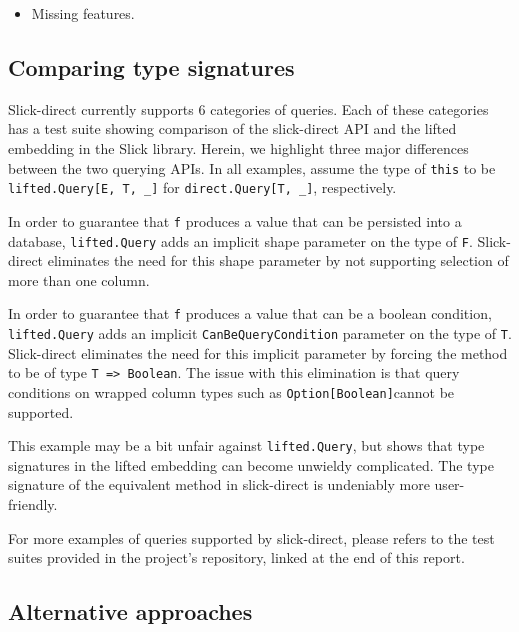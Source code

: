 \begin{itemize}
    \item Missing features.
\end{itemize}


\subsection{Comparing type signatures} %
\label{sub:TypeSignatures}
Slick-direct currently supports 6 categories of queries.
Each of these categories has a test suite showing comparison of the slick-direct API and the lifted embedding in the Slick library.
Herein, we highlight three major differences between the two querying APIs.
In all examples, assume the type of \texttt{this} to be \texttt{lifted.Query[E, T, \_]} for \texttt{direct.Query[T, \_]}, respectively.

In order to guarantee that \texttt{f} produces a value that can be persisted into a database, \texttt{lifted.Query} adds an implicit shape parameter on the type of \texttt{F}.
Slick-direct eliminates the need for this shape parameter by not supporting selection of more than one column.


In order to guarantee that \texttt{f} produces a value that can be a boolean condition, \texttt{lifted.Query} adds an implicit \texttt{CanBeQueryCondition} parameter on the type of \texttt{T}.
Slick-direct eliminates the need for this implicit parameter by forcing the method to be of type \texttt{T => Boolean}.
The issue with this elimination is that query conditions on wrapped column types such as \texttt{Option[Boolean]}cannot be supported.


This example may be a bit unfair against \texttt{lifted.Query}, but shows that type signatures in the lifted embedding can become unwieldy complicated.
The type signature of the equivalent method in slick-direct is undeniably more user-friendly.

For more examples of queries supported by slick-direct, please refers to the test suites provided in the project's repository, linked at the end of this report.


\subsection{Alternative approaches} %
\label{sub:alternatives}

